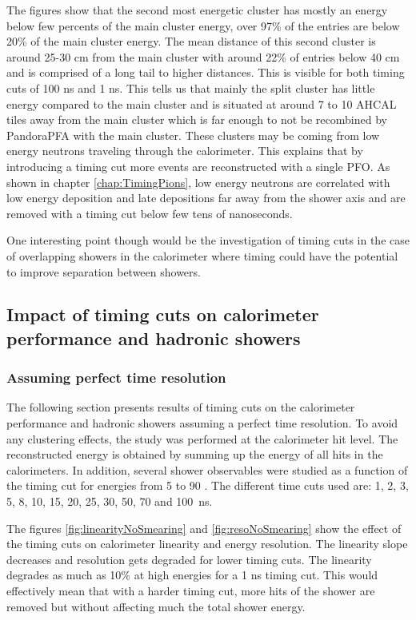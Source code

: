 The figures show that the second most energetic cluster has mostly an energy below few percents of the main cluster energy, over 97\% of the entries are below 20\% of the main cluster energy. The mean distance of this second cluster is around 25-30 cm from the main cluster with around 22\% of entries below 40 cm and is comprised of a long tail to higher distances. This is visible for both timing cuts of 100 ns and 1 ns. This tells us that mainly the split cluster has little energy compared to the main cluster and is situated at around 7 to 10 AHCAL tiles away from the main cluster which is far enough to not be recombined by PandoraPFA with the main cluster. These clusters may be coming from low energy neutrons traveling through the calorimeter. This explains that by introducing a timing cut more events are reconstructed with a single PFO. As shown in chapter \ref{chap:TimingPions}, low energy neutrons are correlated with low energy deposition and late depositions far away from the shower axis and are removed with a timing cut below few tens of nanoseconds.

One interesting point though would be the investigation of timing cuts in the case of overlapping showers in the calorimeter where timing could have the potential to improve separation between showers.

\subsection{Impact of timing cuts on calorimeter performance and hadronic showers}

\subsubsection{Assuming perfect time resolution}

The following section presents results of timing cuts on the calorimeter performance and hadronic showers assuming a perfect time resolution. To avoid any clustering effects, the study was performed at the calorimeter hit level. The reconstructed energy is obtained by summing up the energy of all hits in the calorimeters. In addition, several shower observables were studied as a function of the timing cut for energies from 5 \GeV to 90 \GeV \kzeroL. The different time cuts used are: 1, 2, 3, 5, 8, 10, 15, 20, 25, 30, 50, 70 and \SI{100}{\nano\second}.

The figures \ref{fig:linearityNoSmearing} and \ref{fig:resoNoSmearing} show the effect of the timing cuts on calorimeter linearity and energy resolution. The linearity slope decreases and resolution gets degraded for lower timing cuts. The linearity degrades as much as 10\% at high energies for a 1 ns timing cut. This would effectively mean that with a harder timing cut, more hits of the shower are removed but without affecting much the total shower energy.

